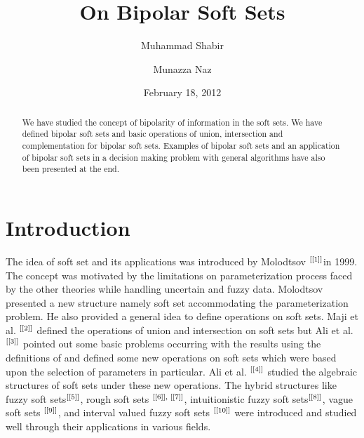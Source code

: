 \documentclass{amsart}
\theoremstyle{plain}
\numberwithin{equation}{section}
\begin{document}
\title{On Bipolar Soft Sets}
\author{Muhammad Shabir}
\address{Department of Mathematics, Quaid-i-Azam University, Islamabad,
Pakistan 46000}
\author{Munazza Naz}
\address{Department of Mathematics, Fatima Jinnah Women University, The
Mall, Rawalpindi, Pakistan 46000}
\date{February 18, 2012}

\begin{abstract}
We have studied the concept of bipolarity of information in the soft sets.
We have defined bipolar soft sets and basic operations of union,
intersection and complementation for bipolar soft sets. Examples of bipolar
soft sets and an application of bipolar soft sets in a decision making
problem with general algorithms have also been presented at the end.
\end{abstract}

\maketitle

\section{Introduction}

The idea of soft set and its applications was introduced by Molodtsov $^{\text{\cite{[1]}}}$in 1999. The concept was motivated by the limitations on
parameterization process faced by the other theories while handling
uncertain and fuzzy data. Molodtsov presented a new structure namely soft
set accommodating the parameterization problem. He also provided a general
idea to define operations on soft sets. Maji et al. $^{\text{\cite{[2]}}}$
defined the operations of union and intersection on soft sets but Ali et al. 
$^{\text{\cite{[3]}}}$ pointed out some basic problems occurring with the
results using the definitions of \cite{[2]} and defined some new operations
on soft sets which were based upon the selection of parameters in
particular. Ali et al. $^{\text{\cite{[4]}}}$ studied the algebraic
structures of soft sets under these new operations. The hybrid structures
like fuzzy soft sets$^{\text{\cite{[5]}}}$, rough soft sets $^{\text{\cite{[6]}, \cite{[7]}}}$, intuitionistic fuzzy soft sets$^{\text{\cite{[8]}}}$,
vague soft sets $^{\text{\cite{[9]}}}$, and interval valued fuzzy soft sets $^{\text{\cite{[10]}}}$ were introduced and studied well through their
applications in various fields.
\end{document}
